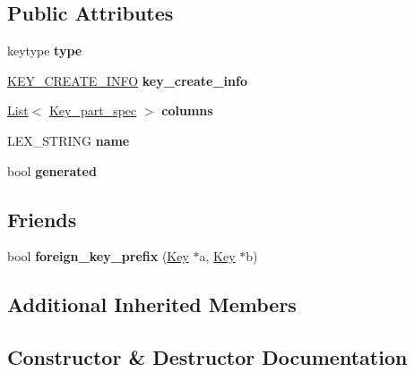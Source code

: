 \subsection*{Public Attributes}
\begin{DoxyCompactItemize}
\item 
\mbox{\label{classKey_a658683e853c0171f2ca6adc1de09a0c0}} 
keytype {\bfseries type}
\item 
\mbox{\label{classKey_afd9a7bed424f56ce9e30695feed941cd}} 
\mbox{\hyperlink{structst__key__create__information}{K\+E\+Y\+\_\+\+C\+R\+E\+A\+T\+E\+\_\+\+I\+N\+FO}} {\bfseries key\+\_\+create\+\_\+info}
\item 
\mbox{\label{classKey_a190dfa8a7771023036b5c5c709b4e088}} 
\mbox{\hyperlink{classList}{List}}$<$ \mbox{\hyperlink{classKey__part__spec}{Key\+\_\+part\+\_\+spec}} $>$ {\bfseries columns}
\item 
\mbox{\label{classKey_ab7efda3d95765d306875fb65905dd5d6}} 
L\+E\+X\+\_\+\+S\+T\+R\+I\+NG {\bfseries name}
\item 
\mbox{\label{classKey_a8ae0de23410896abb4c8afc9261ea29d}} 
bool {\bfseries generated}
\end{DoxyCompactItemize}
\subsection*{Friends}
\begin{DoxyCompactItemize}
\item 
\mbox{\label{classKey_a8cdba4b934f5905f71342ab3047e6a32}} 
bool {\bfseries foreign\+\_\+key\+\_\+prefix} (\mbox{\hyperlink{classKey}{Key}} $\ast$a, \mbox{\hyperlink{classKey}{Key}} $\ast$b)
\end{DoxyCompactItemize}
\subsection*{Additional Inherited Members}


\subsection{Constructor \& Destructor Documentation}
\mbox{\label{classKey_a10737e8c6b396fdd5b8adce7f7a00eec}} 
